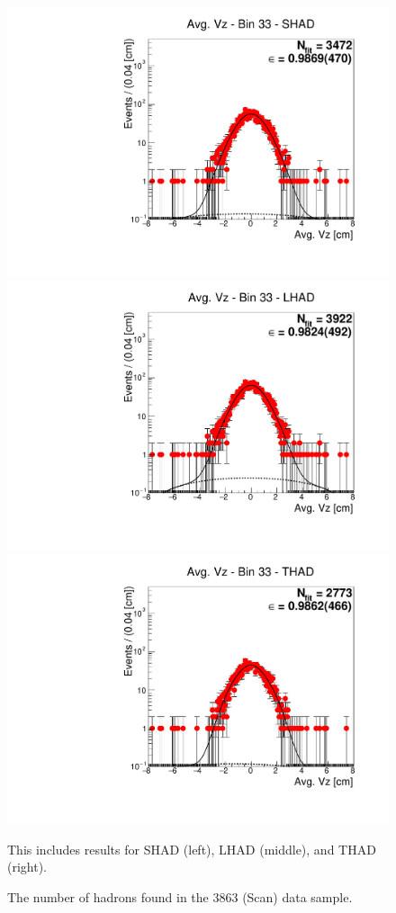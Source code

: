 \begin{figure}[H]
\centering
\includegraphics[scale=0.25]{figures/plots/nonDDbar_fit_results/scan/fit_scan_33_data_SHAD.pdf}
\hspace{-0.5cm}
\includegraphics[scale=0.25]{figures/plots/nonDDbar_fit_results/scan/fit_scan_33_data_LHAD.pdf}
\hspace{-0.5cm}
\includegraphics[scale=0.25]{figures/plots/nonDDbar_fit_results/scan/fit_scan_33_data_THAD.pdf}
\caption{The number of hadrons found in the 3863 (Scan) data sample.}
{This includes results for SHAD (left), LHAD (middle), and THAD (right).}
\label{fig:hadron_fits_scan_33}
\end{figure}
